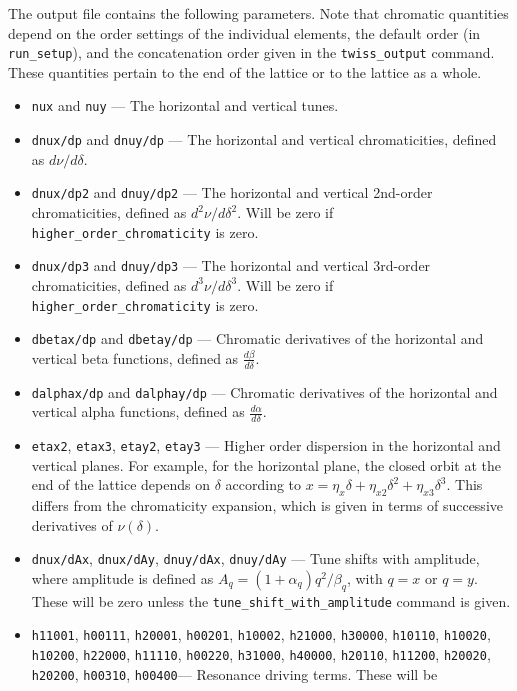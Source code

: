 \documentclass[11pt]{article}
\begin{document}
The output file contains the following parameters.  Note that chromatic quantities depend on the order 
settings of the individual elements, the default order (in \verb|run_setup|), and the concatenation order
given in the \verb|twiss_output| command.  These quantities pertain to the end of the lattice or to the
lattice as a whole.
\begin{itemize}
\item {\tt nux} and {\tt nuy} --- The horizontal and vertical tunes.
\item {\tt dnux/dp} and {\tt dnuy/dp} --- The horizontal and vertical chromaticities, defined as $d\nu/d\delta$.
\item {\tt dnux/dp2} and {\tt dnuy/dp2} --- The horizontal and vertical 2nd-order chromaticities, 
  defined as $d^2\nu/d\delta^2$.  Will be zero if \verb|higher_order_chromaticity| is zero.
\item {\tt dnux/dp3} and {\tt dnuy/dp3} --- The horizontal and vertical 3rd-order chromaticities, 
  defined as $d^3\nu/d\delta^3$.  Will be zero if \verb|higher_order_chromaticity| is zero.
\item {\tt dbetax/dp} and {\tt dbetay/dp} --- Chromatic derivatives of the horizontal and vertical beta functions,
defined as $\frac{d\beta}{d\delta}$.
\item {\tt dalphax/dp} and {\tt dalphay/dp} --- Chromatic derivatives of the horizontal and vertical alpha functions,
defined as $\frac{d\alpha}{d\delta}$.
\item {\tt etax2}, {\tt etax3}, {\tt etay2}, {\tt etay3} --- Higher order dispersion in the horizontal and
  vertical planes.  For example, for the horizontal plane, the closed orbit at the end of the lattice 
  depends on $\delta$ according to
  $x = \eta_x\delta + \eta_{x2} \delta^2 + \eta_{x3}\delta^3$.  This differs from the chromaticity expansion,
  which is given in terms of successive derivatives of $\nu(\delta)$.
\item {\tt dnux/dAx}, {\tt dnux/dAy}, {\tt dnuy/dAx}, {\tt dnuy/dAy} --- Tune shifts with amplitude, where amplitude
  is defined as $A_q = (1 + \alpha_q) q^2/\beta_q$, with $q=x$ or $q=y$.  These will
  be zero unless the \verb|tune_shift_with_amplitude| command is given.
\item {\tt h11001}, {\tt h00111}, {\tt h20001}, {\tt h00201}, {\tt h10002}, {\tt h21000}, {\tt h30000}, {\tt h10110}, {\tt h10020},
{\tt h10200}, {\tt h22000}, {\tt h11110}, {\tt h00220}, {\tt h31000}, {\tt h40000}, {\tt h20110}, {\tt h11200}, {\tt h20020},
{\tt h20200}, {\tt h00310}, {\tt h00400}--- Resonance driving terms\cite{Bengtsson}.  These will be

\end{itemize}
\end{document}
